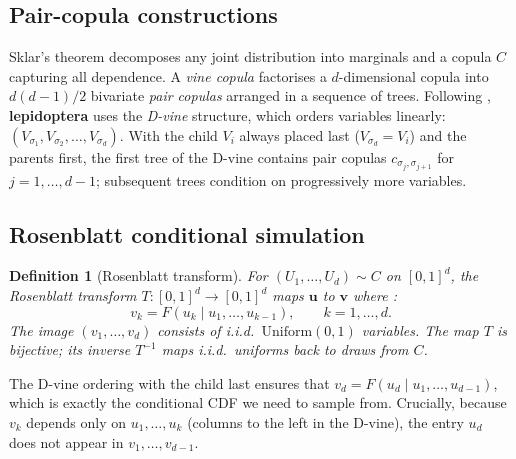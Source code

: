 \documentclass[12pt,a4paper]{article}
\newcommand{\pkg}[1]{\textbf{#1}}
\newtheorem{definition}{Definition}[section]
\begin{document}
\subsection{Pair-copula constructions}
\label{sec:pcc}

Sklar's theorem \citep{sklar1959fonctions} decomposes any joint distribution into
marginals and a copula $C$ capturing all dependence. A \emph{vine copula}
\citep{joe1996families, bedford2002vines, aas2009pair} factorises a
$d$-dimensional copula into $d(d-1)/2$ bivariate \emph{pair copulas} arranged in
a sequence of trees. Following \citet{dissmann2013selecting}, \pkg{lepidoptera}
uses the \emph{D-vine} structure, which orders variables linearly:
$(V_{\sigma_1}, V_{\sigma_2}, \ldots, V_{\sigma_d})$. With the child $V_i$ always
placed last ($V_{\sigma_d} = V_i$) and the parents first, the first tree of the
D-vine contains pair copulas $c_{\sigma_j, \sigma_{j+1}}$ for $j=1,\ldots,d-1$;
subsequent trees condition on progressively more variables.

\subsection{Rosenblatt conditional simulation}
\label{sec:rosenblatt}

\begin{definition}[Rosenblatt transform]
\label{def:rosenblatt}
For $(U_1,\ldots,U_d) \sim C$ on $[0,1]^d$, the \emph{Rosenblatt transform}
$T:[0,1]^d\to[0,1]^d$ maps $\mathbf{u}$ to $\mathbf{v}$ where
\citep{rosenblatt1952remarks}:
\[
  v_k = F(u_k \mid u_1,\ldots,u_{k-1}), \qquad k = 1,\ldots,d.
\]
The image $(v_1,\ldots,v_d)$ consists of i.i.d.\ $\mathrm{Uniform}(0,1)$
variables. The map $T$ is bijective; its inverse $T^{-1}$ maps i.i.d.\ uniforms
back to draws from $C$.
\end{definition}

\noindent
The D-vine ordering with the child last ensures that $v_d = F(u_d \mid
u_1,\ldots,u_{d-1})$, which is exactly the conditional CDF we need to sample from.
Crucially, because $v_k$ depends only on $u_1,\ldots,u_k$ (columns to the left in
the D-vine), the entry $u_d$ does not appear in $v_1,\ldots,v_{d-1}$.
\end{document}
